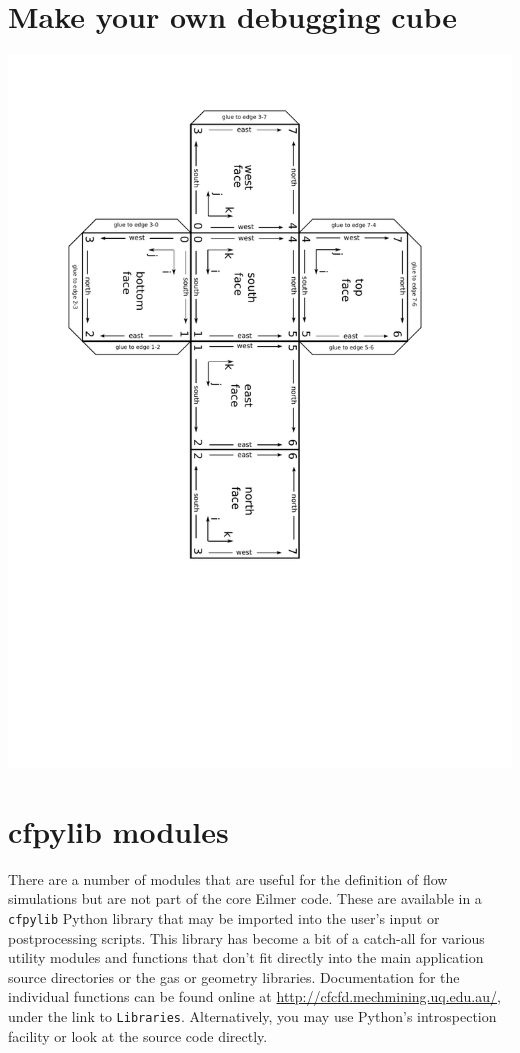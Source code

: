 \documentclass[12pt,a4paper,twoside]{article}
\begin{document}
\section{Make your own debugging cube}
\label{cube-development}
%
\centerline{\includegraphics[viewport=69 220 490 778,clip=true,angle=180]{figs/paper-cube-development.pdf}}

%

\cleardoublepage
\section{cfpylib modules}
\label{cfpylib-sec}
There are a number of modules that are useful for the definition of flow
simulations but are not part of the core Eilmer code.
These are available in a \verb!cfpylib! Python library that may be imported into the
user's input or postprocessing scripts.
This library has become a bit of a catch-all 
for various utility modules and functions that don't fit
directly into the main application source directories or 
the gas or geometry libraries.
Documentation for the individual functions can be found online 
at \url{http://cfcfd.mechmining.uq.edu.au/}, under the link to \verb!Libraries!.
Alternatively, you may use Python's introspection facility or 
look at the source code directly. 
\end{document}
